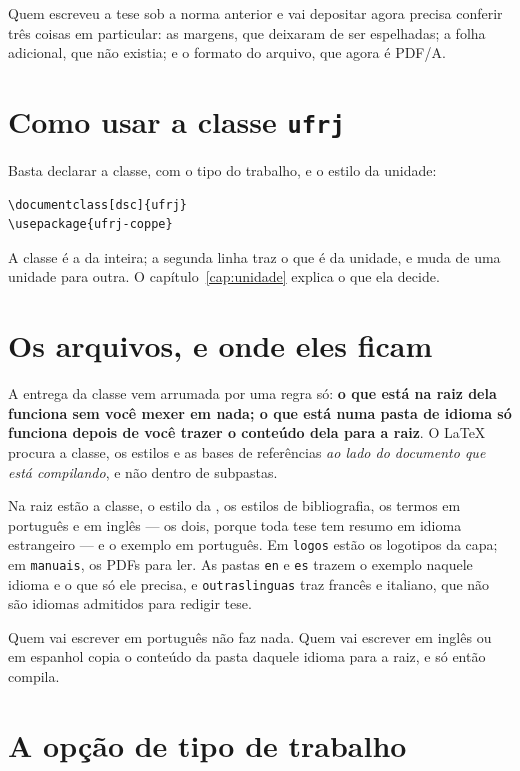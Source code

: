 \documentclass[dsc]{ufrj}
\begin{document}
  Quem escreveu a tese sob a norma anterior e vai depositar agora precisa
  conferir três coisas em particular: as margens, que deixaram de ser
  espelhadas; a folha adicional, que não existia; e o formato do arquivo, que
  agora é PDF/A.

  \section{Como usar a classe \texttt{ufrj}}

  Basta declarar a classe, com o tipo do trabalho, e o estilo da unidade:

\begin{verbatim}
\documentclass[dsc]{ufrj}
\usepackage{ufrj-coppe}
\end{verbatim}

  \noindent A classe é a da  inteira; a segunda linha traz o que é
  da unidade, e muda de uma unidade para outra. O capítulo~\ref{cap:unidade}
  explica o que ela decide.

  \section{Os arquivos, e onde eles ficam}

  A entrega da classe vem arrumada por uma regra só: \textbf{o que está na raiz
  dela funciona sem você mexer em nada; o que está numa pasta de idioma só
  funciona depois de você trazer o conteúdo dela para a raiz}. O \LaTeX{}
  procura a classe, os estilos e as bases de referências \emph{ao lado do
  documento que está compilando}, e não dentro de subpastas.

  Na raiz estão a classe, o estilo da , os estilos de bibliografia, os
  termos em português e em inglês --- os dois, porque toda tese tem resumo em
  idioma estrangeiro --- e o exemplo em português. Em \verb|logos| estão os logotipos da capa; em
  \verb|manuais|, os PDFs para ler. As pastas \verb|en| e \verb|es| trazem o
  exemplo naquele idioma e o que só ele precisa, e \verb|outraslinguas| traz
  francês e italiano, que não são idiomas admitidos para redigir tese.

  Quem vai escrever em português não faz nada. Quem vai escrever em inglês ou
  em espanhol copia o conteúdo da pasta daquele idioma para a raiz, e só então
  compila.

  \section{A opção de tipo de trabalho}
\end{document}
